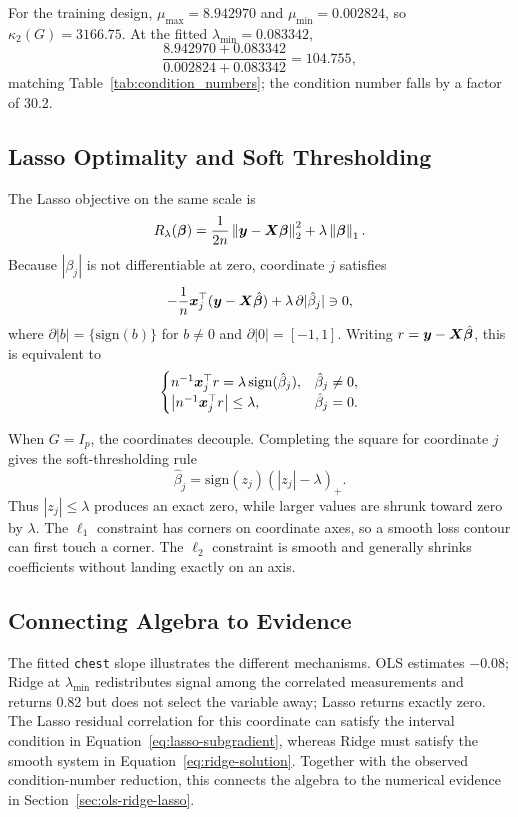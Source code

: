 For the training design, $\mu_{\max}=8.942970$ and
$\mu_{\min}=0.002824$, so $\kappa_2(G)=3166.75$.  At the fitted
$\lambda_{\min}=0.083342$,
\[
 \frac{8.942970+0.083342}{0.002824+0.083342}=104.755,
\]
matching Table~\ref{tab:condition_numbers}; the condition number falls by a
factor of 30.2.

\subsection{Lasso Optimality and Soft Thresholding}
\label{sec:lasso-math}

The Lasso objective on the same scale is
\begin{equation}
 R_\lambda(\bm{\beta})=
 \frac{1}{2n}\left\lVert \bm{y}-\bm{X}\bm{\beta} \right\rVert_2^2+\lambda\left\lVert \bm{\beta} \right\rVert_1.
\label{eq:lasso-obj}
\end{equation}
Because $|\beta_j|$ is not differentiable at zero, coordinate $j$ satisfies
\begin{equation}
 -\frac{1}{n}\bm{x}_j^\top(\bm{y}-\bm{X}\hat{\bm{\beta}})
 +\lambda\,\partial|\hat\beta_j|\ni0,
\label{eq:lasso-subgradient}
\end{equation}
where $\partial|b|=\{\mathrm{sign}(b)\}$ for $b\ne0$ and
$\partial|0|=[-1,1]$.  Writing $r=\bm{y}-\bm{X}\hat{\bm{\beta}}$, this is equivalent to
\[
\begin{cases}
 n^{-1}\bm{x}_j^\top r=\lambda\,\mathrm{sign}(\hat\beta_j),
     & \hat\beta_j\ne0,\\
 \left|n^{-1}\bm{x}_j^\top r\right|\leq\lambda,
     & \hat\beta_j=0.
\end{cases}
\]

When $G=I_p$, the coordinates decouple.  Completing the square for coordinate
$j$ gives the soft-thresholding rule
\begin{equation}
 \boxed{\hat\beta_j
 =\mathrm{sign}(z_j)(|z_j|-\lambda)_+}.
\label{eq:soft-threshold}
\end{equation}
Thus $|z_j|\leq\lambda$ produces an exact zero, while larger values are shrunk
toward zero by $\lambda$.  The $\ell_1$ constraint has corners on coordinate
axes, so a smooth loss contour can first touch a corner.  The $\ell_2$
constraint is smooth and generally shrinks coefficients without landing
exactly on an axis.

\subsection{Connecting Algebra to Evidence}
\label{sec:algebra-evidence}

The fitted \texttt{chest} slope illustrates the different mechanisms.  OLS
estimates $-0.08$; Ridge at $\lambda_{\min}$ redistributes signal among the
correlated measurements and returns 0.82 but does not select the variable
away; Lasso returns exactly zero.  The Lasso residual correlation for this
coordinate can satisfy the interval condition in
Equation~\ref{eq:lasso-subgradient}, whereas Ridge must satisfy the smooth
system in Equation~\ref{eq:ridge-solution}.  Together with the observed
condition-number reduction, this connects the algebra to the numerical
evidence in Section~\ref{sec:ols-ridge-lasso}.
